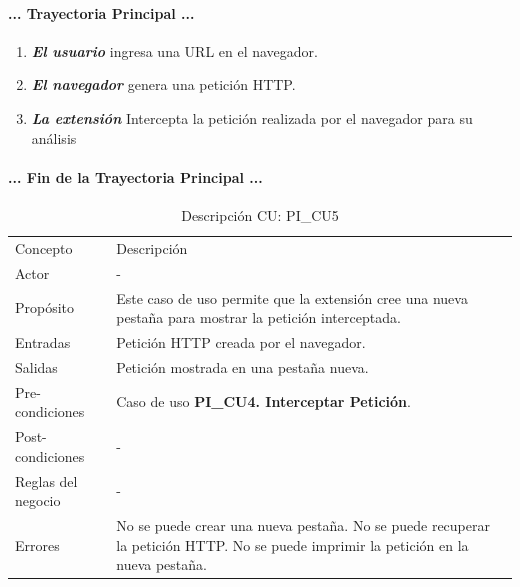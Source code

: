 \documentclass[12pt, a4paper, titlepage]{report}
\begin{document}
				\paragraph{... Trayectoria Principal ...}
				\begin{enumerate}
					\item \textbf{\textit{El usuario}} ingresa una URL en el navegador. 
					\item \textbf{\textit{El navegador}} genera una petición HTTP. 
					\item \textbf{\textit{La extensión}} Intercepta la petición realizada por el navegador para su análisis
				\end{enumerate}
				\paragraph{... Fin de la Trayectoria Principal ...}
				
				\newpage
				
				\begin{table}[H]
				\begin{center}
				\begin{tabular}{ |p{3.5cm}||p{9.5cm}|}
					\hline
					\rowcolor{guindapoli}
					\multicolumn{2}{|c|}{\textbf{\textcolor{white}{Caso de uso: PI\_CU5. Mostrar Petición.}}}\\
					\hline
					\rowcolor{azulfuerte}Concepto & Descripción\\
					\hline
					\cellcolor{azulclaro}Actor & 
					-\\ 
					\hline
					\cellcolor{azulclaro}Propósito &
					Este caso de uso permite que la extensión cree una nueva pestaña para mostrar la petición interceptada.\\
					\hline
					\cellcolor{azulclaro}Entradas &
					Petición HTTP creada por el navegador.\\
					\hline
					\cellcolor{azulclaro}Salidas &
					Petición mostrada en una pestaña nueva.\\
					\hline
					\cellcolor{azulclaro}Pre-condiciones&
				    Caso de uso \textbf{PI\_CU4. Interceptar Petición}.\\
					\hline
					\cellcolor{azulclaro}Post-condiciones&	-\\
					\hline
					\cellcolor{azulclaro}Reglas del negocio&
					-\\
					\hline
					\cellcolor{azulclaro}Errores &
					No se puede crear una nueva pestaña.\newline
					No se puede recuperar la petición HTTP.\newline
					No se puede imprimir la petición en la nueva pestaña.\\
					\hline
				\end{tabular}
				\caption[DCU: PI\_CU5]{Descripción CU: PI\_CU5}
				\end{center}
				\end{table}
			
\end{document}
